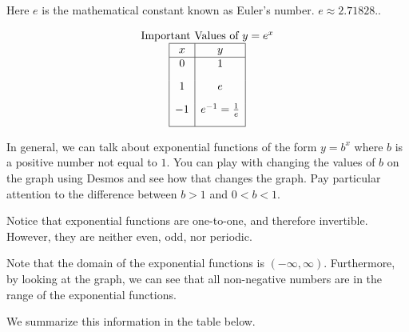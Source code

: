 \documentclass[nooutcomes]{ximera}
\begin{document}
\begin{center}
\end{center}


Here $e$ is the mathematical constant known as Euler's number.  $e \approx 2.71828 .$.

\begin{center}
\end{center}

\[
\begin{array}{c}
 \text{\normalfont Important Values of } y=e^x \\
\begin{array}{|c|c|}
\hline
 x & y \\
 \hline 
 0&1\\[2ex]
 1&e\\[2ex]
 -1&e^{-1}=\frac{1}{e}\\[2ex]
\hline
\end{array}
\end{array}
 \]


In general, we can talk about exponential functions of the form $y=b^{x}$ where $b$ is a positive number not equal to $1$.  You can play with changing the values of $b$ on the graph using Desmos and see how that changes the graph.  Pay particular attention to the difference between $b>1$ and $0<b<1$.

\begin{center}  
\end{center}

Notice that exponential functions are one-to-one, and therefore invertible. However, they are neither even, odd, nor periodic. 

Note that the domain of the exponential functions is $(-\infty, \infty)$. Furthermore, by looking at the graph, we can see that all non-negative numbers are in the range of the exponential functions.

We summarize this information in the table below.
\end{document}
